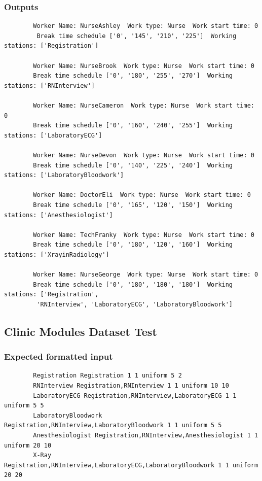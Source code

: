 \documentclass[12pt]{article}
\begin{document}
		\subsubsection{Outputs}
		\begin{verbatim}
		Worker Name: NurseAshley  Work type: Nurse  Work start time: 0 
		 Break time schedule ['0', '145', '210', '225']  Working stations: ['Registration']
		
		Worker Name: NurseBrook  Work type: Nurse  Work start time: 0  
		Break time schedule ['0', '180', '255', '270']  Working stations: ['RNInterview']
	
		Worker Name: NurseCameron  Work type: Nurse  Work start time: 0  
		Break time schedule ['0', '160', '240', '255']  Working stations: ['LaboratoryECG']
	
		Worker Name: NurseDevon  Work type: Nurse  Work start time: 0  
		Break time schedule ['0', '140', '225', '240']  Working stations: ['LaboratoryBloodwork']
	
		Worker Name: DoctorEli  Work type: Nurse  Work start time: 0  
		Break time schedule ['0', '165', '120', '150']  Working stations: ['Anesthesiologist']
	
		Worker Name: TechFranky  Work type: Nurse  Work start time: 0  
		Break time schedule ['0', '180', '120', '160']  Working stations: ['XrayinRadiology']
	
		Worker Name: NurseGeorge  Work type: Nurse  Work start time: 0  
		Break time schedule ['0', '180', '180', '180']  Working stations: ['Registration',
		 'RNInterview', 'LaboratoryECG', 'LaboratoryBloodwork']
		\end{verbatim}
		
		\subsection{Clinic Modules Dataset Test}\label{moduledataset}
		\subsubsection{Expected formatted input}
		\begin{verbatim}
		Registration Registration 1 1 uniform 5 2
		RNInterview Registration,RNInterview 1 1 uniform 10 10
		LaboratoryECG Registration,RNInterview,LaboratoryECG 1 1 uniform 5 5
		LaboratoryBloodwork Registration,RNInterview,LaboratoryBloodwork 1 1 uniform 5 5
		Anesthesiologist Registration,RNInterview,Anesthesiologist 1 1 uniform 20 10
		X-Ray Registration,RNInterview,LaboratoryECG,LaboratoryBloodwork 1 1 uniform 20 20
		\end{verbatim}
\end{document}
